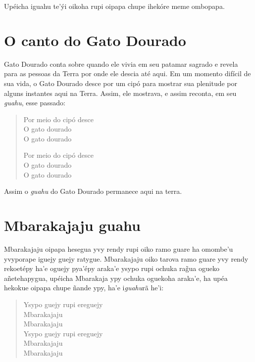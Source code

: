 Upéicha iguahu te'ýi oikoha rupi oipapa chupe ihekóre meme ombopapa.


\chapter{O canto do Gato Dourado}

 Gato Dourado conta sobre quando ele vivia em seu patamar sagrado e
revela para as pessoas da Terra por onde ele descia até aqui. Em um
momento difícil de sua vida, o Gato Dourado desce por um cipó para
mostrar sua plenitude por alguns instantes aqui na Terra. Assim, ele
mostrava, e assim reconta, em seu \emph{guahu}, esse passado:

\begin{verse}
Por meio do cipó desce\\
O gato dourado\\
O gato dourado

Por meio do cipó desce\\
O gato dourado\\
O gato dourado
\end{verse}

Assim o \emph{guahu} do Gato Dourado permanece aqui na terra.

\chapter{Mbarakajaju guahu}

Mbarakajaju oipapa hesegua yvy rendy rupi oiko ramo guare ha omombe'u
yvyporape iguejy guejy ratygue. Mbarakajaju oiko tarova ramo guare yvy
rendy rekoetépy ha'e oguejy pya'épy araka'e ysypo rupi ochuka rag̃ua
ogueko añetehapygua, upéicha Mbarakaja ypy ochuka oguekoha araka'e, ha
upéa hekokue oipapa chupe ñande ypy, ha'e i\emph{guahu}rã he'i:


\begin{verse}
Ysypo guejy rupi ereguejy\\
Mbarakajaju\footnotemark{}\\
Mbarakajaju\\

Ysypo guejy rupi ereguejy\\
Mbarakajaju\\
Mbarakajaju
\end{verse}



